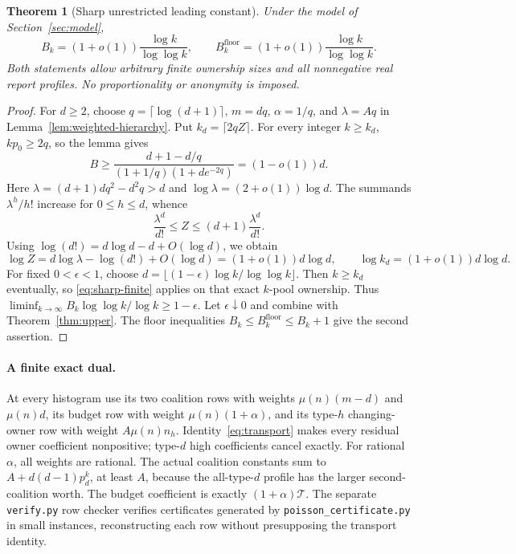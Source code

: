 \documentclass[11pt]{article}
\newtheorem{theorem}{Theorem}[section]
\theoremstyle{definition}\newtheorem{definition}[theorem]{Definition}
\theoremstyle{remark}\newtheorem{remark}[theorem]{Remark}
\begin{document}
\begin{theorem}[Sharp unrestricted leading constant]\label{thm:order}
Under the model of Section~\ref{sec:model},
\[
 B_k=(1+o(1))\frac{\log k}{\log\log k},\qquad
 B_k^{\mathrm{floor}}=(1+o(1))\frac{\log k}{\log\log k}.
\]
Both statements allow arbitrary finite ownership sizes and all nonnegative
real report profiles. No proportionality or anonymity is imposed.
\end{theorem}
\begin{proof}
For $d\ge2$, choose $q=\lceil\log(d+1)\rceil$, $m=dq$,
$\alpha=1/q$, and $\lambda=Aq$ in Lemma~\ref{lem:weighted-hierarchy}.
Put $k_d=\lceil2qZ\rceil$. For every integer $k\ge k_d$, $kp_0\ge2q$,
so the lemma gives
\begin{equation}\label{eq:sharp-finite}
 B\ge\frac{d+1-d/q}{(1+1/q)(1+d e^{-2q})}=(1-o(1))d.
\end{equation}
Here $\lambda=(d+1)dq^2-d^2q>d$ and
$\log\lambda=(2+o(1))\log d$. The summands $\lambda^h/h!$ increase
for $0\le h\le d$, whence
\[
 \frac{\lambda^d}{d!}\le Z\le(d+1)\frac{\lambda^d}{d!}.
\]
Using $\log(d!)=d\log d-d+O(\log d)$, we obtain
\[
 \log Z=d\log\lambda-\log(d!)+O(\log d)
       =(1+o(1))d\log d,
 \qquad \log k_d=(1+o(1))d\log d.
\]
For fixed $0<\epsilon<1$, choose
$d=\lfloor(1-\epsilon)\log k/\log\log k\rfloor$.
Then $k\ge k_d$ eventually, so \eqref{eq:sharp-finite} applies on that
exact $k$-pool ownership. Thus
$\liminf_{k\to\infty}B_k\log\log k/\log k\ge1-\epsilon$.
Let $\epsilon\downarrow0$ and combine with Theorem~\ref{thm:upper}.
The floor inequalities $B_k\le B_k^{\mathrm{floor}}\le B_k+1$
give the second assertion.
\end{proof}

\paragraph{A finite exact dual.}
At every histogram use its two coalition rows with weights
$\mu(n)(m-d)$ and $\mu(n)d$, its budget row with weight
$\mu(n)(1+\alpha)$, and its type-$h$ changing-owner row with weight
$A\mu(n)n_h$. Identity~\eqref{eq:transport} makes every residual owner
coefficient nonpositive; type-$d$ high coefficients cancel exactly.
For rational $\alpha$, all weights are rational. The actual coalition
constants sum to $A+d(d-1)p_d^k$, at least $A$, because the all-type-$d$
profile has the larger second-coalition worth. The budget coefficient is
exactly $(1+\alpha)\mathcal T$. The separate \texttt{verify.py} row checker verifies certificates generated
by \texttt{poisson\_certificate.py} in small instances, reconstructing each
row without presupposing the transport identity.
\end{document}
